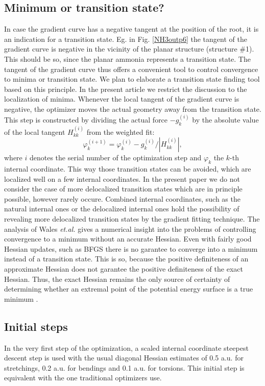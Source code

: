 \documentclass[prl,aps,twocolumn,showpacs,twocolumngrid,superbib]{revtex4}
\begin{document}
\subsection{Minimum or transition state?}
In case the gradient curve has a negative tangent at the position
of the root, it is an indication for a transition state. 
Eg. in Fig. \ref{NH3outp6} the tangent of the gradient curve 
is negative in the vicinity of the planar
structure (structure \#1). This should be so, since the planar
ammonia represents a transition state. The tangent of the gradient 
curve thus offers a
convenient tool to control convergence to minima or transition state.
We plan to elaborate a transition state finding tool based on this 
principle. In the present article we restrict the discussion
to the localization of minima. Whenever the local tangent  
of the gradient curve
is negative, the optimizer moves the actual geometry away from 
the transition state.
This step is constructed by dividing the actual force
$-g_{k}^{(i)}$ by the 
absolute value of the local tangent
$H_{kk}^{(i)}$ from the weighted fit:
\begin{equation}
\label{tseq}
\varphi_{k}^{(i+1)} = \varphi_{k}^{(i)} -g_{k}^{(i)}/|H_{kk}^{(i)}| ,
\end{equation}
where $i$ denotes the serial number of the optimization step and
$\varphi_{k}$ the $k$-th internal coordinate.
This way those transition states 
can be avoided, which are localized well on a few internal coordinates. 
In the present paper we do not consider the case of more 
delocalized transition states which are in principle possible,
however rarely occure. Combined internal coordinates, such
as the natural internal ones \cite{Pulay_natural_internals} or the
delocalized internal ones \cite{Baker_deloc_1} hold the possibility
of revealing more delocalized transition states by the
gradient fitting technique. The analysis of Wales {\it et.al.} 
\cite{Wales_saddlepoint}
gives a numerical insight into the problems of controlling
convergence to a minimum without an accurate Hessian.
Even with fairly good Hessian updates, such 
as BFGS \cite{RFletcher} there is no garantee to converge into
a minimum instead of a transition state. This is so, because
the positive definiteness of an approximate Hessian does not garantee
the positive definiteness of the exact Hessian.
Thus, the
exact Hessian remains the only source of certainty
of determining whether an extremal point of the potential energy surface
is a true minimum \cite{fogarasi_diaghess}.

\subsection{Initial steps}
In the very first step of the optimization,
a scaled internal coordinate steepest descent step is used
with the usual diagonal Hessian estimates of
0.5 a.u. for stretchings, 0.2 a.u. for bendings and 0.1 a.u.
for torsions. This initial step is equivalent with the one
traditional optimizers use.
\end{document}
